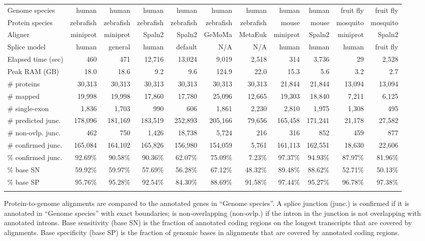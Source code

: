 \documentclass{bioinfo}
\begin{document}
\begin{table*}[!tb]
{\label{tab:eval}
\begin{tabular*}{\textwidth}{@{\extracolsep{\fill}}lrrrrrrrrrr}
\toprule
Genome species     & human   & human   & human   & human   & human   & human   & human   & human   &fruit fly&fruit fly \\
Protein species    &zebrafish&zebrafish&zebrafish&zebrafish&zebrafish&zebrafish& mouse   & mouse   & mosquito& mosquito \\
Aligner            & miniprot& miniprot& Spaln2  & Spaln2  &  GeMoMa & MetaEuk & miniprot& Spaln2  & miniprot& Spaln2 \\
Splice model       & human   & general & human   & default &     N/A &     N/A & human   & human   & human   &fruit fly \\
\midrule
Elapsed time (sec) &     460 &     471 &  12,716 &  13,024 &   9,019 &   2,518 &     314 &   3,736 &      29 &   2,528 \\
Peak RAM (GB)      &    18.0 &    18.6 &     9.2 &     9.6 &   124.9 &    22.0 &    15.3 &     5.6 &     3.2 &     2.7 \\
\# proteins        &  30,313 &  30,313 &  30,313 &  30,313 &  30,313 &  30,313 &  21,844 &  21,844 &  13,094 &  13,094 \\
\# mapped          &  19,998 &  19,998 &  17,860 &  17,780 &  25,096 &  12,665 &  19,303 &  18,840 &   7,211 &   6,125 \\
\# single-exon     &   1,836 &   1,703 &     990 &     606 &   1,861 &   2,230 &   2,810 &   1,975 &   1,308 &     495 \\
\# predicted junc. & 178,096 & 181,169 & 183,519 & 252,893 & 205,166 &  79,656 & 165,458 & 171,241 &  21,178 &  27,582 \\
\# non-ovlp. junc. &     462 &     750 &   1,426 &  18,738 &   5,724 &     216 &     316 &     852 &     459 &     877 \\
\# confirmed junc. & 165,084 & 164,102 & 165,826 & 156,980 & 154,059 &   5,761 & 161,113 & 162,551 &  18,630 &  22,606 \\
\% confirmed junc. & 92.69\% & 90.58\% & 90.36\% & 62.07\% & 75.09\% &  7.23\% & 97.37\% & 94.93\% & 87.97\% & 81.96\% \\
\% base SN         & 59.92\% & 59.97\% & 57.69\% & 56.28\% & 67.12\% & 48.32\% & 89.48\% & 88.62\% & 52.71\% & 50.13\% \\
\% base SP         & 95.76\% & 95.28\% & 92.54\% & 84.30\% & 88.69\% & 91.58\% & 97.44\% & 95.27\% & 96.78\% & 97.38\% \\
\botrule
\end{tabular*}
}{Protein-to-genome alignments are compared to the annotated genes in ``Genome
species''. A splice junction (junc.) is confirmed if it is annotated in
``Genome species'' with exact boundaries; is non-overlapping (non-ovlp.) if the
intron in the junction is not overlapping with annotated introns. Base
sensitivity (base SN) is the fraction of annotated coding regions on the
longest transcripts that are covered by alignments. Base specificity (base SP)
is the fraction of genomic bases in alignments that are covered by annotated
coding regions.}
\end{table*}
\end{document}
